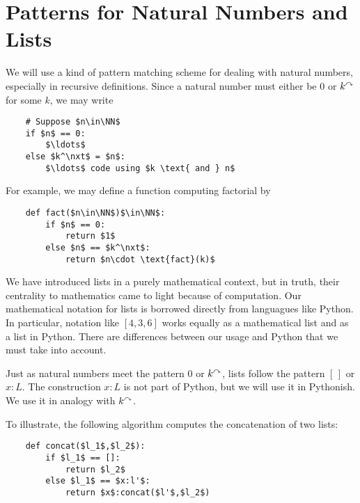 \section{Patterns for Natural Numbers and Lists}

We will use a kind of pattern matching scheme for dealing with natural numbers, especially in recursive definitions. Since a natural number must either be $0$ or $k^\curvearrowright$ for some $k$, we may write 
\begin{lstlisting}
	# Suppose $n\in\NN$ 
	if $n$ == 0:
		$\ldots$
	else $k^\nxt$ = $n$:
		$\ldots$ code using $k \text{ and } n$
\end{lstlisting}

For example, we may define a function computing factorial by

\begin{lstlisting}
	def fact($n\in\NN$)$\in\NN$:
		if $n$ == 0:
			return $1$
		else $n$ == $k^\nxt$:
			return $n\cdot \text{fact}(k)$
\end{lstlisting}

We have introduced lists in a purely mathematical context, but in
truth, their centrality to mathematics came to light because of
computation. Our mathematical notation for lists is borrowed directly
from languagues like Python. In particular, notation like
$[4,3,6]$ works equally as a mathematical list and as a list in
Python. 
There are differences between our usage and Python that we must
take into account.

Just as natural numbers meet the pattern $0$ or $k^\curvearrowright$, lists follow the pattern $[\,]$ or $x:L$. The construction $x:L$ is not part of Python, but we will use it in Pythonish. We use it in analogy with $k^\curvearrowright$.

To illustrate, the following algorithm computes the concatenation of two lists:
\begin{lstlisting}
	def concat($l_1$,$l_2$):
		if $l_1$ == []:
			return $l_2$
		else $l_1$ == $x:l'$:
			return $x$:concat($l'$,$l_2$)
\end{lstlisting}

